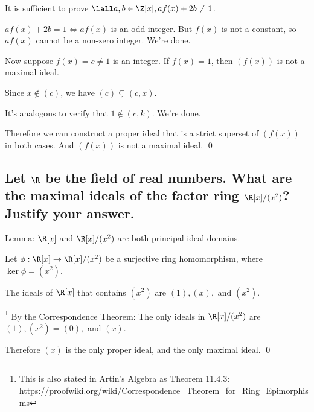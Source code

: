         It is sufficient to prove $\lall a,b \in \Z[x], af(x) + 2b \neq 1$.

        $af(x) + 2b =1 \iff af(x)$ is an odd integer.
        But $f(x)$ is not a constant, so $af(x)$ cannot be a non-zero integer.
        We're done.

        Now suppose $f(x) = c \neq 1$ is an integer. If $f(x) = 1$, then $(f(x))$ is not a maximal ideal.

        Since $x \not\in (c)$, we have $(c) \subsetneq (c, x)$.

        It's analogous to verify that $1 \not\in (c,k)$.
        We're done.

        Therefore we can construct a proper ideal that is a strict superset of $(f(x))$ in both cases.
        And $(f(x))$ is not a maximal ideal.
        \qed


        
    \subsection[(iii)]{Let $\R$ be the field of real numbers. What are the maximal ideals of the factor
        ring $\R[x]/(x^2)$? Justify your answer.}

        Lemma: $\R[x]$ and $\R[x]/(x^2)$ are both principal ideal domains.

        Let $\phi: \R[x] \to \R[x]/(x^2)$ be a surjective ring homomorphism,
        where $\ker{\phi} = (x^2)$.

        The ideals of $\R[x]$ that contains $(x^2)$ are $(1),(x),$ and $(x^2)$.

        \footnote{
            This is also stated in Artin's Algebra as Theorem 11.4.3: \\
            \url{https://proofwiki.org/wiki/Correspondence_Theorem_for_Ring_Epimorphisms}
        }
        By the Correspondence Theorem: The only ideals in $\R[x] / (x^2)$ are $(1), (x^2)=(0),$ and $(x)$.

        Therefore $(x)$ is the only proper ideal,
        and the only maximal ideal.
        \qed
        







